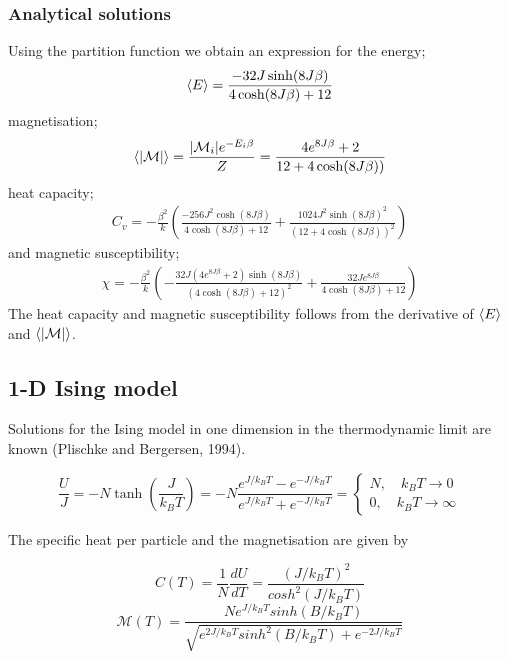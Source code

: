 \documentclass[11pt,a4paper,english,draft]{article}
\numberwithin{equation}{section}
\newcommand{\magM}{\mathcal{M}}
\begin{document}
\subsubsection{Analytical solutions}
Using the partition function we obtain an expression for the energy;
\begin{gather}
\expval{E} = \frac{-32J\sinh(8J\beta)}{4\cosh(8J\beta)+12}
\end{gather}
magnetisation;
\begin{gather}
\expval{\abs{\magM}} = \frac{\abs{\magM_i}e^{-E_i\beta}}{Z}
= \frac{4e^{8J\beta} + 2}{12+4\cosh(8J\beta))}
\end{gather}
heat capacity;
\begin{gather}
C_v = -\frac{\beta^2}{k}\left(\frac{-256J^2\cosh(8J\beta)}{4\cosh(8J\beta) + 12}
 + \frac{1024J^2\sinh(8J\beta)^2}{(12+4\cosh(8J\beta))^2}\right)
\end{gather}
and magnetic susceptibility;
\begin{gather}
\chi = -\frac{\beta^2}{k}\left(- \frac{32 J \left(4 e^{8 J \beta} + 2\right) \sinh{\left (8 J \beta \right )}}{
\left(4 \cosh{\left (8 J \beta \right )} + 12\right)^{2}} 
+ \frac{32 J e^{8 J \beta}}{4 \cosh(8 J \beta) + 12}\right)
\end{gather}
The heat capacity and magnetic susceptibility follows from the derivative 
of $\expval{E}$ and $\expval{\abs{\magM}}$.

\subsection{1-D Ising model}
Solutions for the Ising model in one dimension in the 
thermodynamic limit are known (Plischke and Bergersen, 1994). 

\begin{equation}
\frac{U}{J} = -N \tanh \left( \frac{J}{k_B T} \right) = -N \frac{e^{J/k_B T}-e^{-J/k_B T} }{e^{J/k_B T}+ e^{-J/k_B T} } =  \begin{cases} N, \quad k_B T \to 0 \\ 0, \quad  k_B T \to \infty \end{cases}
\end{equation}

The specific heat per particle and the magnetisation are given by 

\begin{equation}
C(T) = \frac{1}{N} \frac{dU}{dT} = \frac{(J/k_B T)^2}{cosh^2 (J/k_B T)}
\end{equation}
\begin{equation}
\magM(T) = \frac{N e^{J / k_B T} sinh(B/k_B T) }{ \sqrt{ e^{2J/k_B T} sinh^2 (B/k_B T) + e^{-2J/ k_B T}  } }
\end{equation}
\end{document}
